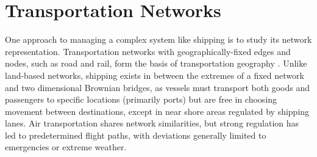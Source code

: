 
\section{Transportation Networks}




One approach to managing a complex system like shipping is to study its network representation.  Transportation networks with geographically-fixed edges and nodes, such as road and rail, form the basis of transportation geography \citep{Rodrigue2009}. Unlike land-based networks, shipping exists in between the extremes of a fixed network %
 and two dimensional Brownian bridges, as vessels must transport both goods and passengers to specific locations (primarily ports) but are free in choosing movement between destinations, except in near shore areas regulated by shipping lanes. Air transportation shares network similarities, but strong regulation has led to predetermined flight paths, with deviations generally limited to emergencies or extreme weather. %

